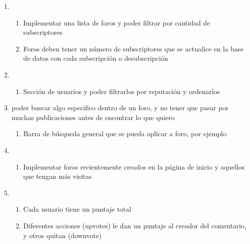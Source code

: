 \documentclass[12pt, letterpaper, notitlepage]{article}
\begin{document}
\begin{enumerate}
        \item {}
        \begin{enumerate}
            \item Implementar una lista de foros y poder filtrar por cantidad de subscriptores
            \item Foros deben tener un número de subscriptores que se actualice en la base de datos con cada subscripción o desubscripción
        \end{enumerate}


        \item {}
        \begin{enumerate}
            \item Sección de usuarios y poder filtrarlos por reputación y ordenarlos
        \end{enumerate}


        \item {}
        {poder buscar algo especifico dentro de un foro, y no tener que pasar por muchas publicaciones antes de encontrar lo que quiero}
        \begin{enumerate}
            \item Barra de búsqueda general que se pueda aplicar a foro, por ejemplo 
        \end{enumerate}


        \item {}
        \begin{enumerate}
            \item Implementar foros recientemente creados en la página de inicio y aquellos que tengan más visitas
        \end{enumerate}


        \item {}
        \begin{enumerate}
            \item Cada usuario tiene un puntaje total
            \item Diferentes acciones (upvotes) le dan un puntaje al creador del comentario, y otros quitan (downvote)
        \end{enumerate}



\end{enumerate}
\end{document}
